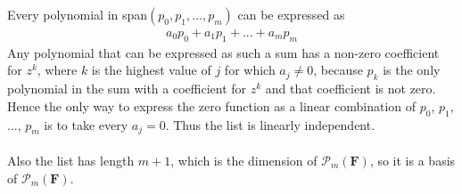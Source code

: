 \documentclass[a4paper]{article}
\begin{document}
\Large
Every polynomial in span$(p_0, p_1, ..., p_m)$ can be expressed as
\begin{align*}
    a_0p_0 + a_1p_1 + ... + a_mp_m
\end{align*}
Any polynomial that can be expressed as such a sum has a non-zero coefficient for $z^k$, where $k$ is the highest value of $j$ for which $a_j\neq 0$, because $p_k$ is the only polynomial in the sum with a coefficient for $z^k$ and that coefficient is not zero.
Hence the only way to express the zero function as a linear combination of $p_0$, $p_1$, ..., $p_m$ is to take every $a_j = 0$.
Thus the list is linearly independent.
\\
\\
Also the list has length $m+1$, which is the dimension of $\mathcal{P}_m(\textbf{F})$, so it is a basis of $\mathcal{P}_m(\textbf{F})$.
\end{document}
